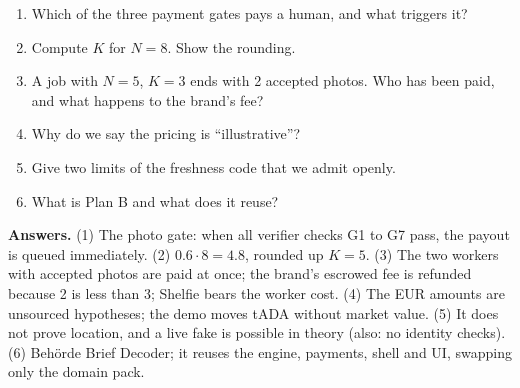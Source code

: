 \begin{quizbox}
\begin{enumerate}
  \item Which of the three payment gates pays a human, and what triggers it?
  \item Compute $K$ for $N=8$. Show the rounding.
  \item A job with $N=5$, $K=3$ ends with 2 accepted photos. Who has been paid, and what happens to the brand's fee?
  \item Why do we say the pricing is ``illustrative''?
  \item Give two limits of the freshness code that we admit openly.
  \item What is Plan B and what does it reuse?
\end{enumerate}
{\small\color{cGrey}\textbf{Answers.}
(1) The photo gate: when all verifier checks G1 to G7 pass, the payout is queued immediately.
(2) $0.6\cdot8=4.8$, rounded up $K=5$.
(3) The two workers with accepted photos are paid at once; the brand's escrowed fee is refunded because 2 is less than 3; Shelfie bears the worker cost.
(4) The EUR amounts are unsourced hypotheses; the demo moves tADA without market value.
(5) It does not prove location, and a live fake is possible in theory (also: no identity checks).
(6) Behörde Brief Decoder; it reuses the engine, payments, shell and UI, swapping only the domain pack.}
\end{quizbox}
